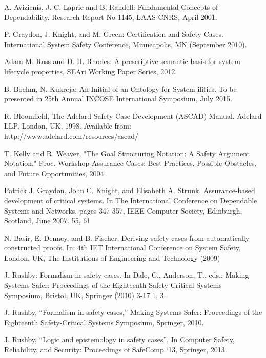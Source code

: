 \documentclass{article} %
\begin{document}
\small{
\begin{thebibliography}{}


A. Avizienis, J.-C. Laprie and B. Randell: Fundamental Concepts of Dependability. Research Report No 1145, LAAS-CNRS, April 2001.


P. Graydon, J. Knight, and M. Green: Certification and Safety Cases. International System Safety Conference, Minneapolis, MN (September 2010).

Adam M. Ross and D. H. Rhodes: A prescriptive semantic basis for system lifecycle properties, SEAri Working Paper Series, 2012.

B. Boehm, N. Kukreja: An Initial of an Ontology for System ilities. To be presented in 25th Annual INCOSE International Symposium, July 2015.

R. Bloomfield, The Adelard Safety Case Development (ASCAD) Manual. Adelard LLP, London, UK, 1998. Available from: http://www.adelard.com/resources/ascad/

T. Kelly and R. Weaver, "The Goal Structuring Notation: A Safety Argument Notation," Proc. Workshop Assurance Cases: Best Practices, Possible Obstacles, and Future Opportunities, 2004. 

Patrick J. Graydon, John C. Knight, and Elisabeth A. Strunk. Assurance-based
development of critical systems. In The International Conference on Dependable 
Systems and Networks, pages 347-357, IEEE Computer Society, Edinburgh, 
Scotland, June 2007. 55, 61

N. Basir, E. Denney, and B. Fischer: Deriving safety cases from automatically constructed proofs. In: 4th IET International Conference on System Safety, London, UK, The Institutions of Engineering and Technology (2009)

J. Rushby: Formalism in safety cases. In Dale, C., Anderson, T., eds.: Making Systems Safer: Proceedings of the Eighteenth Safety-Critical Systems Symposium, Bristol, UK, Springer (2010) 3-17 1, 3.

J. Rushby, “Formalism in safety cases,” Making Systems Safer: Proceedings of the Eighteenth Safety-Critical Systems Symposium, Springer, 2010.

J. Rushby, “Logic and epistemology in safety cases”, In Computer Safety, Reliability, and Security: Proceedings of SafeComp ‘13, Springer, 2013.


\end{thebibliography}}
\end{document}
